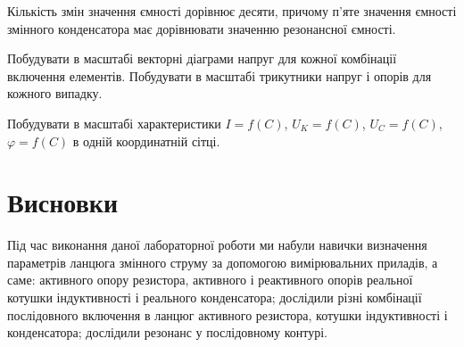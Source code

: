 \documentclass[a4paper,oneside,DIV=10,12pt]{scrartcl}
\begin{document}
		Кількість змін значення ємності дорівнює десяти, причому п'яте значення ємності змінного конденсатора має дорівнювати значенню резонансної ємності.
		
		Побудувати в масштабі векторні діаграми напруг для кожної комбінації включення елементів. Побудувати в масштабі трикутники напруг і опорів для кожного випадку.
		
		Побудувати в масштабі характеристики $I = f(C)$, $U_K = f(C)$, $U_C = f(C)$, $\varphi = f(C)$ в одній координатній сітці.
		
	\section{Висновки}
		Під час виконання даної лабораторної роботи ми набули навички визначення параметрів ланцюга змінного струму за допомогою вимірювальних приладів, а саме: активного опору резистора, активного і реактивного опорів реальної котушки індуктивності і реального конденсатора; дослідили різні комбінації послідовного включення в ланцюг активного резистора, котушки індуктивності і конденсатора; дослідили резонанс у послідовному контурі.
\end{document}
